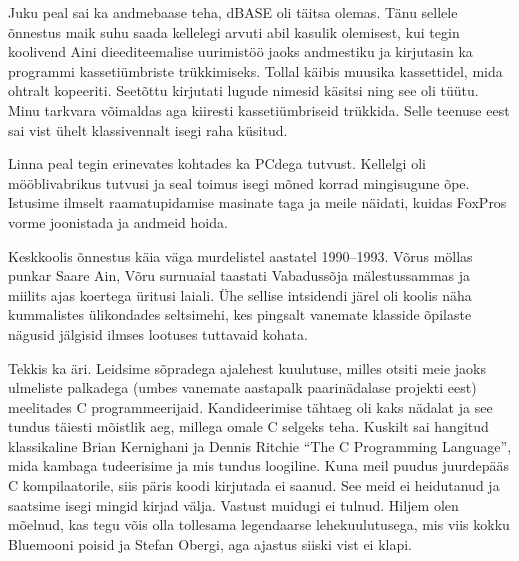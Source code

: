 Juku peal sai ka andmebaase teha, dBASE oli täitsa olemas. 
Tänu sellele õnnestus maik suhu saada kellelegi arvuti abil kasulik olemisest, kui tegin 
koolivend Aini dieediteemalise uurimistöö jaoks andmestiku ja kirjutasin 
ka programmi kassetiümbriste trükkimiseks. Tollal käibis muusika kassettidel, 
mida ohtralt kopeeriti. 
Seetõttu kirjutati lugude 
nimesid käsitsi ning see oli tüütu. Minu tarkvara võimaldas aga kiiresti 
kassetiümbriseid trükkida. Selle teenuse eest sai vist ühelt 
klassivennalt isegi raha küsitud.

Linna peal tegin erinevates kohtades ka PCdega tutvust. Kellelgi oli mööblivabrikus 
tutvusi ja seal toimus isegi mõned korrad mingisugune õpe. Istusime ilmselt 
raamatupidamise masinate taga ja meile näidati, kuidas FoxPros 
vorme joonistada ja andmeid hoida. 

Keskkoolis õnnestus käia väga murdelistel aastatel 1990--1993. Võrus möllas 
punkar Saare Ain, Võru surnuaial 
taastati Vabadussõja mälestussammas ja miilits ajas koertega üritusi laiali. 
Ühe sellise intsidendi järel oli koolis näha kummalistes ülikondades 
seltsimehi, kes pingsalt vanemate klasside õpilaste nägusid jälgisid ilmses 
lootuses tuttavaid kohata. 

Tekkis ka äri. Leidsime sõpradega 
ajalehest kuulutuse, milles otsiti meie jaoks ulmeliste palkadega (umbes 
vanemate aastapalk paarinädalase projekti eest) meelitades C 
programmeerijaid. Kandideerimise tähtaeg oli kaks nädalat ja see 
tundus täiesti mõistlik aeg, millega omale C selgeks teha. Kuskilt sai hangitud 
klassikaline Brian Kernighani ja Dennis Ritchie \enquote{The C Programming 
Language}, mida kambaga tudeerisime ja mis tundus 
loogiline. Kuna meil puudus juurdepääs C kompilaatorile, siis päris koodi 
kirjutada ei saanud. See meid ei heidutanud ja saatsime isegi mingid kirjad välja. Vastust muidugi ei tulnud. Hiljem olen mõelnud, kas tegu võis olla 
tollesama legendaarse lehekuulutusega, mis viis kokku Bluemooni 
poisid ja Stefan Obergi, aga ajastus siiski vist ei klapi. 

